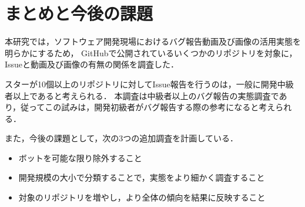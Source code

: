 \section{まとめと今後の課題\label{validity}}
本研究では，ソフトウェア開発現場におけるバグ報告動画及び画像の活用実態を明らかにするため，
GitHubで公開されているいくつかのリポジトリを対象に，Issueと動画及び画像の有無の関係を調査した．

スターが10個以上のリポジトリに対してIssue報告を行うのは，一般に開発中級者以上であると考えられる．
本調査は中級者以上のバグ報告の実態調査であり，従ってこの試みは，開発初級者がバグ報告する際の参考になると考えられる．

また，今後の課題として，次の3つの追加調査を計画している．
\begin{itemize}
  \item ボットを可能な限り除外すること
  \item 開発規模の大小で分類することで，実態をより細かく調査すること
  \item 対象のリポジトリを増やし，より全体の傾向を結果に反映すること
\end{itemize}
